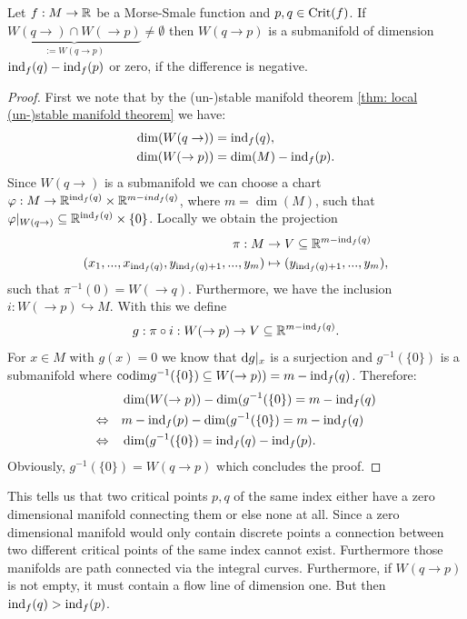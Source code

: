  
 \begin{remark}[From $p$ to $q$] \label{rem: dimension from q to p }
 Let $f:M\to \mathbb{R}$ be a Morse-Smale function and $p,q\in \mathrm{Crit}(f)$. If $\underbrace{W(q\to)\cap W(\to p)}_{:=W(q\to p)} \neq \emptyset$ then $W(q\to p)$ is a submanifold of dimension $\mathrm{ind}_f(q)-\mathrm{ind}_f(p)$ or zero, if the difference is negative.
 \end{remark}
\begin{proof}
    First we note that by the (un-)stable manifold theorem \ref{thm: local (un-)stable manifold theorem} we have:
    \begin{align*}
        \dim(W(q\to))&=\mathrm{ind}_f(q), \\
        \dim(W(\to p))&=\dim(M)-\mathrm{ind}_f(p).
    \end{align*} Since $W(q\to)$ is a submanifold we can choose a chart $\varphi: M\to \mathbb{R}^{\mathrm{ind}_f(q)}\times \mathbb{R}^{m-ind_f(q)}$, where $m=\dim(M)$, such that $\varphi|_{W(q\to)}\subseteq \mathbb{R}^{\mathrm{ind}_f(q)}\times \{0\}$. Locally we obtain the projection 
    \begin{align*}
        \pi: M &\to V \subseteq \mathbb{R}^{m-\mathrm{ind}_f(q)}\\
        (x_1,...,x_{\mathrm{ind}_f(q)},y_{\mathrm{ind}_f(q)+1},...,y_m) &\mapsto (y_{\mathrm{ind}_f(q)+1},...,y_m),
    \end{align*}such that $\pi^{-1}(0)=W(\to q)$. Furthermore, we have the inclusion $i:W(\to p) \hookrightarrow M$. With this we define $$g:\pi \circ i:W(\to p) \to  V \subseteq \mathbb{R}^{m-\mathrm{ind}_f(q)}. $$ For $x\in M$ with $g(x)=0$ we know that $\mathop{}\!\mathrm{d} g |_x$ is a surjection and $g^{-1}(\{0\})$ is a submanifold where $\text{codim} g^{-1}(\{0\})\subseteq W(\to p))=m-\mathrm{ind}_f(q)$. Therefore: \begin{align*}
       & \dim(W(\to p))-\dim(g^{-1}(\{0\})=m-\mathrm{ind}_f(q) \\ \Leftrightarrow \quad & m-\mathrm{ind}_f(p)-\dim(g^{-1}(\{0\})=m-\mathrm{ind}_f(q)\\
        \Leftrightarrow \quad &\dim(g^{-1}(\{0\})=\mathrm{ind}_f(q)-\mathrm{ind}_f(p).
    \end{align*}
    Obviously, $g^{-1}(\{0\})=W(q\to p)$ which concludes the proof.
\end{proof}






\begin{corollary} \label{cor: lambda lemma flow lines have decreasing index}
    This tells us that two critical points $p,q$ of the same index either have a zero dimensional manifold connecting them or else none at all. Since a zero dimensional manifold would only contain discrete points a connection between two different critical points of the same index cannot exist. Furthermore those manifolds are path connected via the integral curves. Furthermore, if $W(q\to p)$ is not empty, it must contain a flow line of dimension one. But then $\mathrm{ind}_f(q)>\mathrm{ind}_f(p)$.
\end{corollary}


